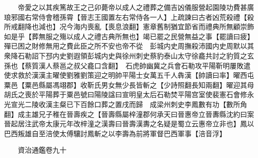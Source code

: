 　　帝愛之以其疾篤故王之己卯薨帝以成人之禮葬之備吉凶儀服營起園陵功費甚廣琅邪國右常侍會稽孫霄【晉志王國置左右常侍各一人】上疏諫曰古者凶荒殺禮【殺所戒翻降也減也】况今海内喪亂【喪息浪翻】憲章舊制猶宜節省而禮典所無顧崇飾如是乎【葬無服之殤以成人之禮古典所無也】竭已罷之民營無益之事【罷讀曰疲】殫已困之財修無用之費此臣之所不安也帝不從　彭城内史周撫殺沛國内史周默以其衆降石勒詔下邳内史劉遐領彭城内史與徐州刺史蔡豹泰山太守徐龕共討之豹質之玄孫也【蔡質漢人蔡邕之叔父龕口含翻】　石虎帥幽冀之兵會石勒攻平陽靳明屢敗遣使求救於漢漢主曜使劉雅劉策迎之明帥平陽士女萬五千人犇漢【帥讀曰率】曜西屯粟邑【粟邑縣屬馮翊郡】收靳氏男女無少長皆斬之【少詩照翻長知兩翻】曜迎其母胡氏之喪於平陽葬于粟邑號曰陽陵諡曰宣明皇太后石勒焚平陽宫室使裴憲石會修永光宣光二陵收漢主粲已下百餘口葬之置戌而歸　成梁州刺史李鳳數有功【數所角翻】成主雄兄子稚在晉壽疾之【晉壽縣屬梓潼郡何承天曰晉惠帝立晉夀縣沈約曰案晉起居注武帝太康元年改梓潼之漢壽曰晉壽漢夀之名疑是蜀立云惠帝立非也】鳳以巴西叛雄自至涪使太傅驤討鳳斬之以李壽為前將軍督巴西軍事【涪音浮】

　　資治通鑑卷九十  
    


 


 



 

 
  







 


　　
　　
　
　
　


　　

　















	
	









































